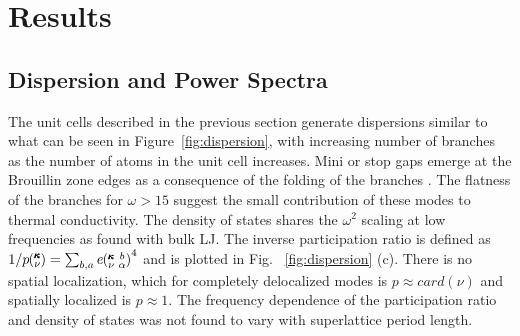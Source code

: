 \documentclass[aps,prb,preprint,preprintnumbers,amsmath,amssymb,floatfix,superscriptaddress]{revtex4}
\newcommand{\kvba}{\mspace{-4.0mu}\left(\mspace{-8.0mu}
\begin{smallmatrix} &\pmb{\kappa} &b \\ &\nu &\alpha\end{smallmatrix}
\mspace{-3.0mu}\right)}
\newcommand{\kv}{\mspace{-4.0mu}\left(\mspace{-8.0mu}
\begin{smallmatrix}&\pmb{\kappa} \\&\nu\end{smallmatrix}
\mspace{-3.0mu}\right)}
\begin{document}
\section{Results}
\subsection{Dispersion and Power Spectra}

The unit cells described in the previous section generate dispersions similar to what can be seen in Figure~\ref{fig:dispersion}, with increasing number of branches as the number of atoms in the unit cell increases. Mini or stop gaps emerge at the Brouillin zone edges as a consequence of the folding of the branches \cite{PhysRevB.38.1427,PhysRevB.60.2627}. The flatness of the branches for $\omega > 15$ suggest the small contribution of these modes to thermal conductivity. The density of states shares the $\omega^2$ scaling at low frequencies as found with bulk LJ. The inverse participation ratio is defined as $1/p\kv=\sum_{b,a}e\kvba^4$ and is plotted in Fig. ~\ref{fig:dispersion} (c). There is no spatial localization, which for completely delocalized modes is $p\approx card(\nu)$ and spatially localized is $p\approx 1$. \cite{PhysRevB.70.235214} The frequency dependence of the participation ratio and density of states was not found to vary with superlattice period length.
\renewcommand{\topfraction}{0.7}
\begin{figure*}%
\begin{center}
\renewcommand{\figure}{Fig.}
\caption{Dispersion, density of states and inverse participation ratio of a 4x4 superlattice. Red squares represent select modes for Figure~\ref{fig:sed}.}
\label{fig:dispersion}
\end{center}
\end{figure*}
\end{document}
